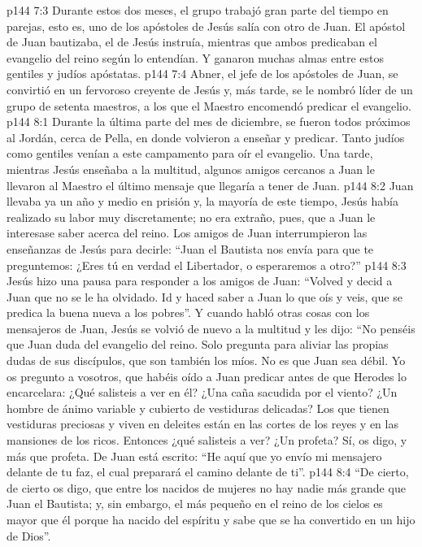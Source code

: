 \vs p144 7:3 Durante estos dos meses, el grupo trabajó gran parte del tiempo en parejas, esto es, uno de los apóstoles de Jesús salía con otro de Juan. El apóstol de Juan bautizaba, el de Jesús instruía, mientras que ambos predicaban el evangelio del reino según lo entendían. Y ganaron muchas almas entre estos gentiles y judíos apóstatas.
\vs p144 7:4 Abner, el jefe de los apóstoles de Juan, se convirtió en un fervoroso creyente de Jesús y, más tarde, se le nombró líder de un grupo de setenta maestros, a los que el Maestro encomendó predicar el evangelio.
\vs p144 8:1 Durante la última parte del mes de diciembre, se fueron todos próximos al Jordán, cerca de Pella, en donde volvieron a enseñar y predicar. Tanto judíos como gentiles venían a este campamento para oír el evangelio. Una tarde, mientras Jesús enseñaba a la multitud, algunos amigos cercanos a Juan le llevaron al Maestro el último mensaje que llegaría a tener de Juan.
\vs p144 8:2 Juan llevaba ya un año y medio en prisión y, la mayoría de este tiempo, Jesús había realizado su labor muy discretamente; no era extraño, pues, que a Juan le interesase saber acerca del reino. Los amigos de Juan interrumpieron las enseñanzas de Jesús para decirle: “Juan el Bautista nos envía para que te preguntemos: ¿Eres tú en verdad el Libertador, o esperaremos a otro?”
\vs p144 8:3 Jesús hizo una pausa para responder a los amigos de Juan: “Volved y decid a Juan que no se le ha olvidado. Id y haced saber a Juan lo que oís y veis, que se predica la buena nueva a los pobres”. Y cuando habló otras cosas con los mensajeros de Juan, Jesús se volvió de nuevo a la multitud y les dijo: “No penséis que Juan duda del evangelio del reino. Solo pregunta para aliviar las propias dudas de sus discípulos, que son también los míos. No es que Juan sea débil. Yo os pregunto a vosotros, que habéis oído a Juan predicar antes de que Herodes lo encarcelara: ¿Qué salisteis a ver en él? ¿Una caña sacudida por el viento? ¿Un hombre de ánimo variable y cubierto de vestiduras delicadas? Los que tienen vestiduras preciosas y viven en deleites están en las cortes de los reyes y en las mansiones de los ricos. Entonces ¿qué salisteis a ver? ¿Un profeta? Sí, os digo, y más que profeta. De Juan está escrito: “He aquí que yo envío mi mensajero delante de tu faz, el cual preparará el camino delante de ti”.
\vs p144 8:4 “De cierto, de cierto os digo, que entre los nacidos de mujeres no hay nadie más grande que Juan el Bautista; y, sin embargo, el más pequeño en el reino de los cielos es mayor que él porque ha nacido del espíritu y sabe que se ha convertido en un hijo de Dios”.
